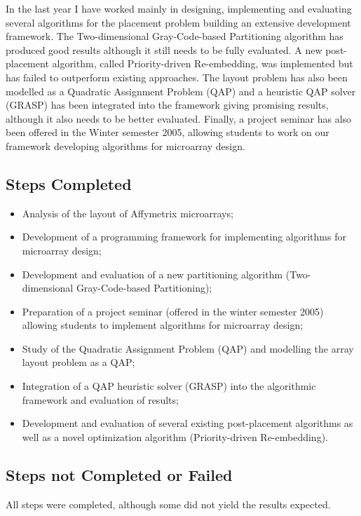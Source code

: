\documentclass{article}
\begin{document}
In the last year I have worked mainly in designing, implementing and evaluating several algorithms for the placement problem building an extensive development framework. The Two-dimensional Gray-Code-based Partitioning algorithm has produced good results although it still needs to be fully evaluated. A new post-placement algorithm, called Priority-driven Re-embedding, was implemented but has failed to outperform existing approaches. The layout problem has also been modelled as a Quadratic Assignment Problem (QAP) and a heuristic QAP solver (GRASP) has been integrated into the framework giving promising results, although it also needs to be better evaluated. Finally, a project seminar has also been offered in the Winter semester 2005, allowing students to work on our framework developing algorithms for microarray design.

\subsection*{Steps Completed}

\begin{itemize}
\item Analysis of the layout of Affymetrix microarrays;
\item Development of a programming framework for implementing algorithms for microarray design;
\item Development and evaluation of a new partitioning algorithm (Two-dimensional Gray-Code-based Partitioning);
\item Preparation of a project seminar (offered in the winter semester 2005) allowing students to implement algorithms for microarray design;
\item Study of the Quadratic Assignment Problem (QAP) and modelling the array layout problem as a QAP;
\item Integration of a QAP heuristic solver (GRASP) into the algorithmic framework and evaluation of results;
\item Development and evaluation of several existing post-placement algorithms as well as a novel optimization algorithm (Priority-driven Re-embedding).
\end{itemize}

\subsection*{Steps not Completed or Failed}

All steps were completed, although some did not yield the results expected.
\end{document}
